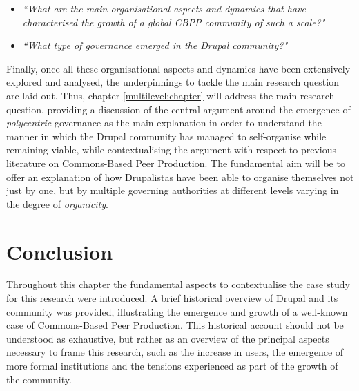 \begin{itemize}
	 \item \emph{``What are the main organisational aspects and dynamics that have characterised the growth of a global CBPP community of such a scale?"}
	 \item \emph{``What type of governance emerged in the Drupal community?"}
\end{itemize}

Finally, once all these organisational aspects and dynamics have been extensively explored and analysed, the underpinnings to tackle the main research question are laid out. Thus, chapter \ref{multilevel:chapter} will address the main research question, providing a discussion of the central argument around the emergence of \textit{polycentric} governance as the main explanation in order to understand the manner in which the Drupal community has managed to self-organise while remaining viable, while contextualising the argument with respect to previous literature on Commons-Based Peer Production. The fundamental aim will be to offer an explanation of how Drupalistas have been able to organise themselves not just by one, but by multiple governing authorities at different levels varying in the degree of \textit{organicity}.

\section{Conclusion}

Throughout this chapter the fundamental aspects to contextualise the case study for this research were introduced. A brief historical overview of Drupal and its community was provided, illustrating the emergence and growth of a well-known case of Commons-Based Peer Production. This historical account should not be understood as exhaustive, but rather as an overview of the principal aspects necessary to frame this research, such as the increase in users, the emergence of more formal institutions and the tensions experienced as part of the growth of the community.

